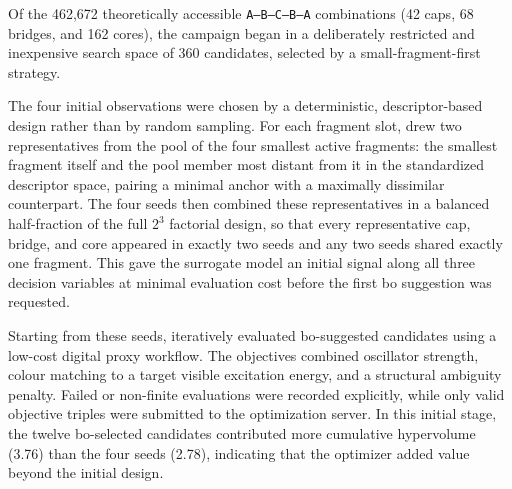 Of the 462,672 theoretically accessible \texttt{A--B--C--B--A} combinations (42 caps, 68 bridges, and 162 cores), the campaign began in a deliberately restricted and inexpensive search space of 360 candidates, selected by a small-fragment-first strategy.

The four initial observations were chosen by a deterministic, descriptor-based design rather than by random sampling.
For each fragment slot, \optima{} drew two representatives from the pool of the four smallest active fragments: the smallest fragment itself and the pool member most distant from it in the standardized descriptor space, pairing a minimal anchor with a maximally dissimilar counterpart.
The four seeds then combined these representatives in a balanced half-fraction of the full $2^3$ factorial design, so that every representative cap, bridge, and core appeared in exactly two seeds and any two seeds shared exactly one fragment.
This gave the surrogate model an initial signal along all three decision variables at minimal evaluation cost before the first \ac{bo} suggestion was requested.

Starting from these seeds, \optima{} iteratively evaluated \ac{bo}-suggested candidates using a low-cost digital proxy workflow.
The objectives combined oscillator strength, colour matching to a target visible excitation energy, and a structural ambiguity penalty.
Failed or non-finite evaluations were recorded explicitly, while only valid objective triples were submitted to the optimization server.
In this initial stage, the twelve \ac{bo}-selected candidates contributed more cumulative hypervolume (3.76) than the four seeds (2.78), indicating that the optimizer added value beyond the initial design.

